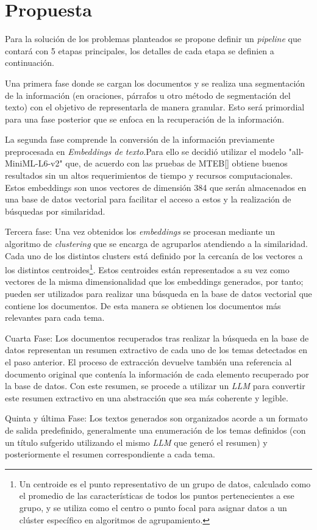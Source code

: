 \chapter{Propuesta}\label{chapter:proposal}
    Para la solución de los problemas planteados se propone definir un \emph{pipeline} que contará con 5 etapas principales, los detalles de cada etapa se definien a continuación.

    Una primera fase donde se cargan los documentos y se realiza una segmentación de la información (en oraciones, párrafos u otro método de segmentación del texto) con el objetivo de representarla de manera granular. Esto será primordial para una fase posterior que se enfoca en la recuperación de la información.
    
    La segunda fase comprende la conversión de la información previamente preprocesada en \emph{Embeddings de texto}.Para ello se decidió utilizar el modelo "all-MiniML-L6-v2" que, de acuerdo con las pruebas de MTEB[\cite{leaderboard}] obtiene buenos resultados sin un altos requerimientos de tiempo y recursos computacionales. Estos embeddings son unos vectores de dimensión 384 que serán almacenados en una base de datos vectorial para facilitar el acceso a estos y la realización de búsquedas por similaridad.

    Tercera fase: Una vez obtenidos los \emph{embeddings} se procesan  mediante un algoritmo de \emph{clustering} que se encarga de agruparlos atendiendo a la similaridad. Cada uno de los distintos clusters está definido por la cercanía de los vectores a los distintos centroides\footnote{Un centroide es el punto representativo de un grupo de datos, calculado como el promedio de las características de todos los puntos pertenecientes a ese grupo, y se utiliza como el centro o punto focal para asignar datos a un clúster específico en algoritmos de agrupamiento.}. Estos centroides están representados a su vez como vectores de la misma dimensionalidad que los embeddings generados, por tanto; pueden ser utilizados para realizar una búsqueda en la base de datos vectorial que contiene los documentos. De esta manera se obtienen los documentos más relevantes para cada tema.

    Cuarta Fase: Los documentos recuperados tras realizar la búsqueda en la base de datos representan un resumen extractivo de cada uno de los temas detectados en el paso anterior. El proceso de extracción devuelve también una referencia al documento original que contenía la información de cada elemento recuperado por la base de datos. Con este resumen, se procede a utilizar un \emph{LLM} para convertir este resumen extractivo en una abstracción que sea más coherente y legible.

    Quinta y última Fase: Los textos generados son organizados acorde a un formato de salida predefinido, generalmente una enumeración de los temas definidos (con un título sufgerido utilizando el mismo \emph{LLM} que generó el resumen) y posteriormente el resumen correspondiente a cada tema.
